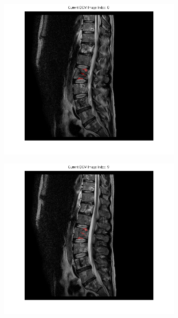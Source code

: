 \documentclass{article}
\begin{document}
{\begin{figure}[h]
\begin{subfigure}[t]{0.15\linewidth}
      \end{subfigure}
      \hfill\begin{subfigure}[t]{0.15\linewidth}
        \centering
        \includegraphics[width=\linewidth,trim={6cm 3cm 6cm 0},clip]{imgs/mask08}
      \end{subfigure}
      \hfill
      \begin{subfigure}[t]{0.15\linewidth}
        \centering
        \includegraphics[width=\linewidth,trim={6cm 3cm 6cm 0},clip]{imgs/mask09}
      \end{subfigure}
      \vspace{.5cm}
      

\end{figure}}
\end{document}
